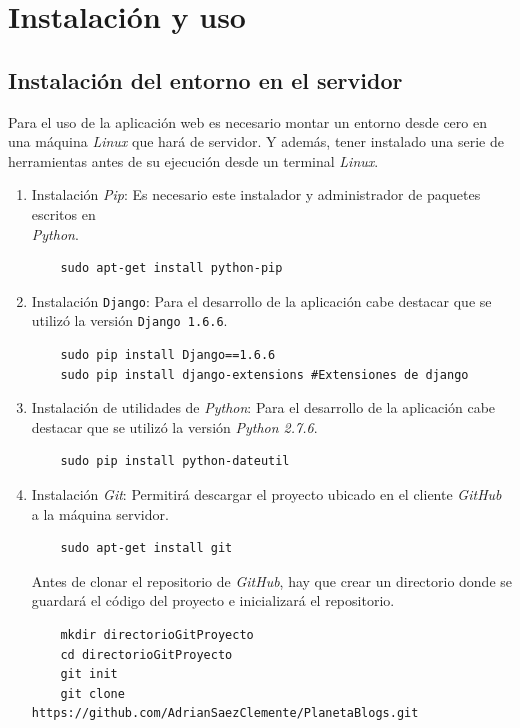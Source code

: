 \documentclass[a4paper, 12pt]{book}
\begin{document}
\chapter{Instalaci\'on y uso}
\label{app:instalacionuso}

\section{Instalaci\'on del entorno en el servidor}
Para el uso de la aplicaci\'on web es necesario montar un entorno desde cero en una m\'aquina \textit{Linux} que har\'a de servidor. Y adem\'as, tener 
instalado una serie de herramientas antes de su ejecuci\'on desde un terminal \textit{Linux}.
\begin{enumerate}
  \item Instalaci\'on \textit{Pip}: Es necesario este instalador y administrador de paquetes escritos en\\ \textit{Python}.
    {\footnotesize\begin{verbatim} 
    sudo apt-get install python-pip\end{verbatim}}
  \item Instalaci\'on \texttt{Django}: Para el desarrollo de la aplicaci\'on cabe destacar que se utiliz\'o la versi\'on \texttt{Django 1.6.6}.
    {\footnotesize\begin{verbatim} 
    sudo pip install Django==1.6.6
    sudo pip install django-extensions #Extensiones de django \end{verbatim}}
  \item Instalaci\'on de utilidades de \textit{Python}: Para el desarrollo de la aplicaci\'on cabe destacar que se utiliz\'o la versi\'on 
  \textit{Python 2.7.6}.
    {\footnotesize\begin{verbatim} 
    sudo pip install python-dateutil \end{verbatim}}
  \item Instalaci\'on \textit{Git}: Permitir\'a descargar el proyecto ubicado en el cliente \textit{GitHub} a la m\'aquina servidor.
    {\footnotesize\begin{verbatim} 
    sudo apt-get install git \end{verbatim}}
  Antes de clonar el repositorio de \textit{GitHub}, hay que crear un directorio donde se guardar\'a el c\'odigo del proyecto e inicializar\'a el repositorio.
    {\footnotesize\begin{verbatim} 
    mkdir directorioGitProyecto 
    cd directorioGitProyecto 
    git init 
    git clone https://github.com/AdrianSaezClemente/PlanetaBlogs.git \end{verbatim}}

\end{enumerate}
\end{document}
